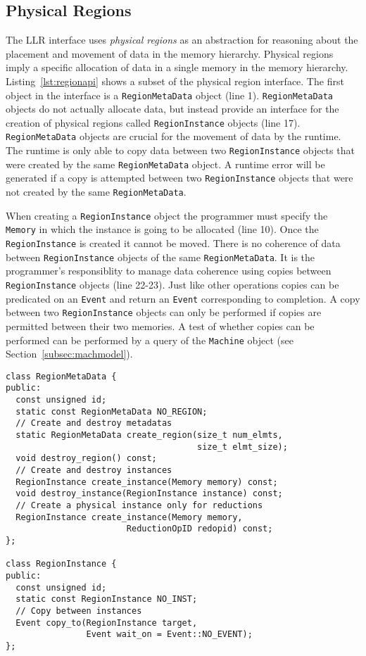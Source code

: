 \subsection{Physical Regions}
\label{subsec:phyreg}

The LLR interface uses {\em physical regions} as an abstraction for reasoning about
the placement and movement of data in the memory hierarchy.  Physical regions imply a specific
allocation of data in a single memory in the memory hierarchy.  Listing~\ref{lst:regionapi} 
shows a subset of the physical region interface.  The first object in the interface
is a {\tt RegionMetaData} object (line 1).  {\tt RegionMetaData} objects 
do not actually allocate data, but instead provide an interface for the
creation of physical regions called {\tt RegionInstance} objects (line 17).  {\tt RegionMetaData}
objects are crucial for the movement of data by the runtime.  The runtime is only able
to copy data between two {\tt RegionInstance} objects that were created by the
same {\tt RegionMetaData} object.  A runtime error will be generated if a copy is attempted
between two {\tt RegionInstance} objects that were not created by the same {\tt RegionMetaData}.

When creating a {\tt RegionInstance} object the programmer must specify the {\tt Memory}
in which the instance is going to be allocated (line 10).  Once the {\tt RegionInstance} is created it
cannot be moved.   There is no coherence of data between {\tt RegionInstance} objects of the
same {\tt RegionMetaData}.  It is the programmer's responsiblity to manage data coherence
using copies between {\tt RegionInstance} objects (line 22-23).  Just like other operations
copies can be predicated on an {\tt Event} and return an {\tt Event} corresponding to
completion.  A copy between two {\tt RegionInstance} objects can only be performed if copies
are permitted between their two memories.  A test of whether copies can be performed can be performed 
by a query of the {\tt Machine} object (see Section~\ref{subsec:machmodel}).



\begin{lstlisting}[float={t},label={lst:regionapi},caption={Subset of Physical Region Interface.}]
class RegionMetaData {
public:
  const unsigned id;
  static const RegionMetaData NO_REGION;
  // Create and destroy metadatas
  static RegionMetaData create_region(size_t num_elmts, 
                                      size_t elmt_size);
  void destroy_region() const;
  // Create and destroy instances
  RegionInstance create_instance(Memory memory) const;
  void destroy_instance(RegionInstance instance) const;
  // Create a physical instance only for reductions
  RegionInstance create_instance(Memory memory, 
                        ReductionOpID redopid) const;
};

class RegionInstance {
public:
  const unsigned id;
  static const RegionInstance NO_INST;
  // Copy between instances
  Event copy_to(RegionInstance target, 
                Event wait_on = Event::NO_EVENT);
};
\end{lstlisting}

